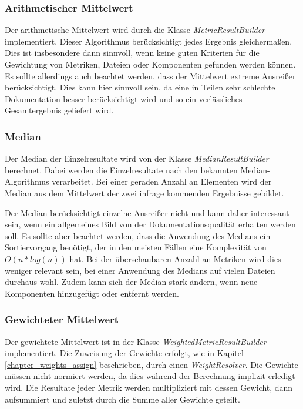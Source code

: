 \subsubsection{Arithmetischer Mittelwert}
Der arithmetische Mittelwert wird durch die Klasse \textit{MetricResultBuilder} implementiert. Dieser Algorithmus berücksichtigt jedes Ergebnis gleichermaßen. Dies ist insbesondere dann sinnvoll, wenn keine guten Kriterien für die Gewichtung von Metriken, Dateien oder Komponenten gefunden werden können. Es sollte allerdings auch beachtet werden, dass der Mittelwert extreme Ausreißer berücksichtigt. Dies kann hier sinnvoll sein, da eine in Teilen sehr schlechte Dokumentation besser berücksichtigt wird und so ein verlässliches Gesamtergebnis geliefert wird.


\subsubsection{Median}
Der Median der Einzelresultate wird von der Klasse \textit{MedianResultBuilder} berechnet. Dabei werden die Einzelresultate nach den bekannten Median-Algorithmus verarbeitet. Bei einer geraden Anzahl an Elementen wird der Median aus dem Mittelwert der zwei infrage kommenden Ergebnisse gebildet. 

Der Median berücksichtigt einzelne Ausreißer nicht und kann daher interessant sein, wenn ein allgemeines Bild von der Dokumentationsqualität erhalten werden soll. Es sollte aber beachtet werden, dass die Anwendung des Medians ein Sortiervorgang benötigt, der in den meisten Fällen eine Komplexität von $O(n*log(n))$ hat. Bei der überschaubaren Anzahl an Metriken wird dies weniger relevant sein, bei einer Anwendung des Medians auf vielen Dateien durchaus wohl. Zudem kann sich der Median stark ändern, wenn neue Komponenten hinzugefügt oder entfernt werden.


\subsubsection{Gewichteter Mittelwert}
Der gewichtete Mittelwert ist in der Klasse \textit{WeightedMetricResultBuilder} implementiert. Die Zuweisung der Gewichte erfolgt, wie in Kapitel \ref{chapter_weights_assign} beschrieben, durch einen \textit{WeightResolver}. Die Gewichte müssen nicht normiert werden, da dies während der Berechnung implizit erledigt wird. Die Resultate jeder Metrik werden multipliziert mit dessen Gewicht, dann aufsummiert und zuletzt durch die Summe aller Gewichte geteilt. 


